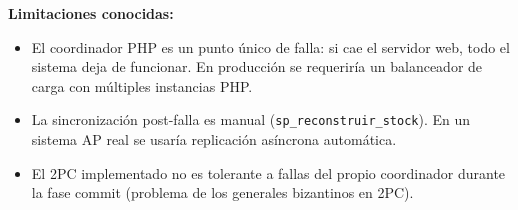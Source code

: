 \documentclass[11pt,a4paper]{article}
\newcommand{\code}[1]{\texttt{#1}}
\begin{document}
\textbf{Limitaciones conocidas:}

\begin{itemize}[nosep]
    \item El coordinador PHP es un punto único de falla: si cae el servidor web, todo el sistema deja de funcionar. En producción se requeriría un balanceador de carga con múltiples instancias PHP.
    \item La sincronización post-falla es manual (\code{sp\_reconstruir\_stock}). En un sistema AP real se usaría replicación asíncrona automática.
    \item El 2PC implementado no es tolerante a fallas del propio coordinador durante la fase commit (problema de los generales bizantinos en 2PC).
\end{itemize}
\end{document}
